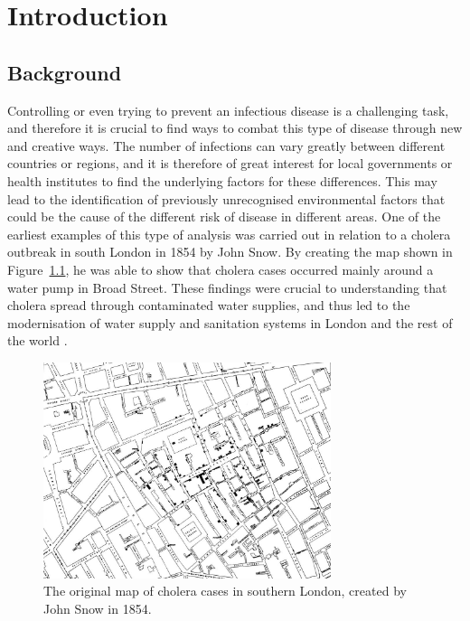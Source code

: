 %
\chapter{Introduction}
\label{sec:intro}
\section{Background}
Controlling or even trying to prevent an infectious disease is a challenging task, and therefore it is crucial to find ways to combat this type of disease through new and creative ways. The number of infections can vary greatly between different countries or regions, and it is therefore of great interest for local governments or health institutes to find the underlying factors for these differences. This may lead to the identification of previously unrecognised environmental factors that could be the cause of the different risk of disease in different areas. One of the earliest examples of this type of analysis was carried out in relation to a cholera outbreak in south London in 1854 by John Snow. By creating the map shown in Figure~\ref{cholera}, he was able to show that cholera cases occurred mainly around a water pump in Broad Street. These findings were crucial to understanding that cholera spread through contaminated water supplies, and thus led to the modernisation of water supply and sanitation systems in London and the rest of the world \cite{snow1857cholera}.
\begin{figure}[H]
    \centering
    \includegraphics[width = 0.75\textwidth]{cholera_map.jpg}
    \caption{The original map of cholera cases in southern London, created by John Snow in 1854.}
    \label{cholera}
\end{figure}
